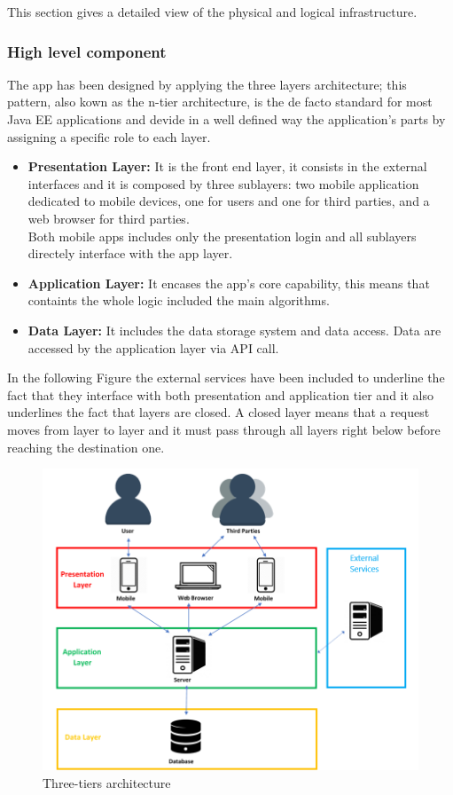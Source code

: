 This section gives a detailed view of the physical and logical infrastructure.

\subsubsection{High level component}
The app has been designed by applying the three layers architecture; this pattern, also kown as the n-tier architecture, is the de facto standard for most Java EE applications and devide in a well defined way the application's parts  by assigning a specific role to each layer.
\begin{itemize}
	\item \textbf{Presentation Layer:} It is the front end layer, it consists in the external interfaces and it is composed by three 			sublayers: two mobile application  dedicated to mobile devices, one for users and one for third parties, and a web browser for 			third parties.\\ Both mobile apps  includes only the presentation login and all sublayers directely interface with the app layer.
	\item \textbf{Application Layer:} It encases the app's core capability, this means that containts the whole logic included the main 		algorithms. 
	\item \textbf{Data Layer:} It includes the data storage system and data access. Data are accessed by the application layer 			via API call.
\end{itemize}In the following Figure the external services have been included to underline the fact that they interface with both presentation and application tier and it also underlines the fact that layers are closed. A closed layer means that a request moves from layer to layer and it  must pass through all layers right below before reaching the destination one.

\begin{figure}[h!]
	\includegraphics[width=1.0\textwidth]{./pictures/design_arch.png}\par
	\caption{Three-tiers architecture}
\end{figure}
\FloatBarrier

